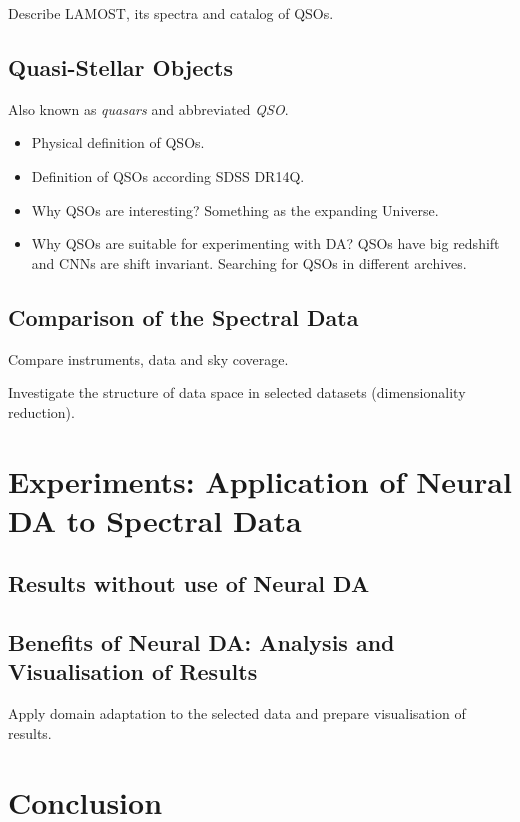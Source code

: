 \documentclass[thesis=M,english]{FITthesis}[2012/10/20]
\begin{document}
Describe LAMOST, its spectra and catalog of QSOs.

\section{Quasi-Stellar Objects}

Also known as \textit{quasars} and abbreviated \textit{QSO}.

\begin{itemize}
	\item Physical definition of QSOs.
	\item Definition of QSOs according SDSS DR14Q.
	\item Why QSOs are interesting? Something as the expanding Universe.
	\item Why QSOs are suitable for experimenting with DA?
		QSOs have big redshift and CNNs are shift invariant.
		Searching for QSOs in different archives.
\end{itemize}

\section{Comparison of the Spectral Data}

Compare instruments, data and sky coverage.

Investigate the structure of data space in selected datasets (dimensionality reduction).

\chapter{Experiments: Application of Neural DA to Spectral Data}
\label{exp_chapter}

\section{Results without use of Neural DA}

\section{Benefits of Neural DA: Analysis and Visualisation of Results}

Apply domain adaptation to the selected data
and prepare visualisation of results.

\chapter{Conclusion}
\end{document}
